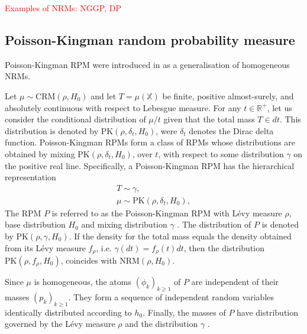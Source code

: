 \textcolor{red}{Examples of NRMs: NGGP, DP}

\subsection{Poisson-Kingman random probability measure}
Poisson-Kingman \gls{RPM} were introduced in \cite{pitman2003pkp} as a generalisation of homogeneous NRMs. \\

\begin{definition} \label{def:PKRPM}
Let $\mu \sim \text{CRM}(\rho, H_0)$ and let $T = \mu(\mathbb{X})$ be finite, positive almost-surely, and absolutely continuous with respect to Lebesgue measure. For any $t \in \mathbb{R}^+$, let us consider the conditional distribution of $\mu/t$ given that the total mass $T \in dt$. This distribution is denoted by $\text{PK}(\rho, \delta_t , H_0)$, were $\delta_t$ denotes the Dirac delta function. Poisson-Kingman \gls{RPM}s form a class of \gls{RPM}s whose distributions are obtained by mixing $\text{PK}(\rho, \delta_t , H_0)$, over $t$, with respect to some distribution  $\gamma$ on the positive real line. Specifically, a Poisson-Kingman \gls{RPM} has the hierarchical representation
\begin{gather*}
T \sim \gamma, \\
\mu \sim \text{PK}(\rho, \delta_t, H_0),
\end{gather*}
The \gls{RPM} $P$ is referred to as the Poisson-Kingman \gls{RPM} with Lévy measure $\rho$, base distribution $H_0$ and mixing distribution $\gamma$ . The distribution of $P$ is denoted by $\text{PK}(\rho, \gamma , H_0)$. If the density for the total mass equals the density obtained from its Lévy measure $f_\rho$, i.e. $\gamma(dt) = f_\rho(t) dt$, then the distribution $\text{PK}(\rho, f_\rho , H_0)$, coincides with $\text{NRM}(\rho, H_0)$.

Since $\mu$ is homogeneous, the atoms $\left(\phi_k \right)_{k \ge 1}$ of $P$ are independent of their masses $\left(p_k \right)_{k \ge 1}$. They form a sequence of independent random variables identically distributed according to $h_0$. Finally, the masses of $P$ have distribution governed by the Lévy measure $\rho$ and the distribution $\gamma$ .
\end{definition}


